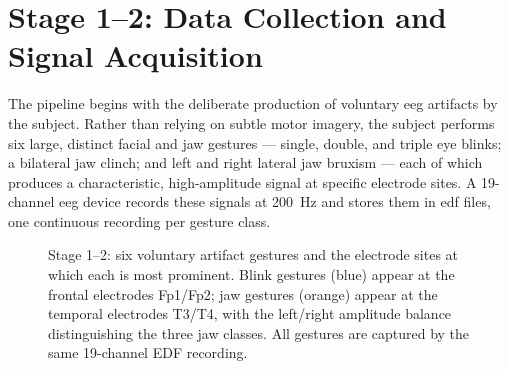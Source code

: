\section{Stage 1--2: Data Collection and Signal Acquisition}
\label{sec:mo_collection}

The pipeline begins with the deliberate production of voluntary
\acrshort{eeg} artifacts by the subject. Rather than relying on
subtle motor imagery, the subject performs six large, distinct
facial and jaw gestures --- single, double, and triple eye blinks;
a bilateral jaw clinch; and left and right lateral jaw bruxism ---
each of which produces a characteristic, high-amplitude signal at
specific electrode sites. A 19-channel \acrshort{eeg} device records
these signals at \SI{200}{\hertz} and stores them in
\acrshort{edf} files, one continuous recording per gesture class.

\begin{figure}[htbp]
\centering
{}
\caption{Stage 1--2: six voluntary artifact gestures and the
electrode sites at which each is most prominent. Blink gestures
(blue) appear at the frontal electrodes Fp1/Fp2; jaw gestures
(orange) appear at the temporal electrodes T3/T4, with the
left/right amplitude balance distinguishing the three jaw classes.
All gestures are captured by the same 19-channel EDF recording.}
\label{fig:mo_collection}
\end{figure}

